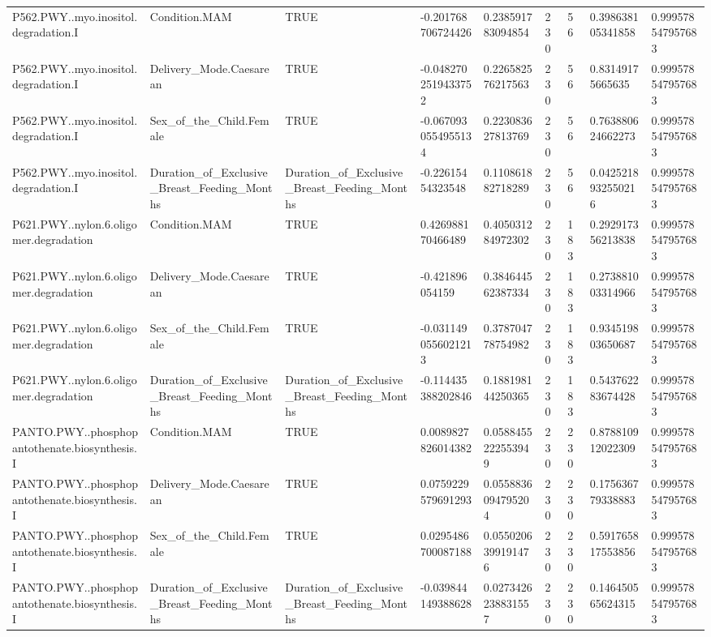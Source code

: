 \begin{longtable}{lllllllll}
P562.PWY..myo.inositol.degradation.I & Condition.MAM & TRUE & -0.201768706724426 & 0.238591783094854 & 230 & 56 & 0.398638105341858 & 0.999578547957683 \\
P562.PWY..myo.inositol.degradation.I & Delivery\_Mode.Caesarean & TRUE & -0.0482702519433752 & 0.226582576217563 & 230 & 56 & 0.83149175665635 & 0.999578547957683 \\
P562.PWY..myo.inositol.degradation.I & Sex\_of\_the\_Child.Female & TRUE & -0.0670930554955134 & 0.223083627813769 & 230 & 56 & 0.763880624662273 & 0.999578547957683 \\
P562.PWY..myo.inositol.degradation.I & Duration\_of\_Exclusive\_Breast\_Feeding\_Months & Duration\_of\_Exclusive\_Breast\_Feeding\_Months & -0.22615454323548 & 0.110861882718289 & 230 & 56 & 0.0425218932550216 & 0.999578547957683 \\
P621.PWY..nylon.6.oligomer.degradation & Condition.MAM & TRUE & 0.426988170466489 & 0.405031284972302 & 230 & 183 & 0.292917356213838 & 0.999578547957683 \\
P621.PWY..nylon.6.oligomer.degradation & Delivery\_Mode.Caesarean & TRUE & -0.421896054159 & 0.384644562387334 & 230 & 183 & 0.273881003314966 & 0.999578547957683 \\
P621.PWY..nylon.6.oligomer.degradation & Sex\_of\_the\_Child.Female & TRUE & -0.0311490556021213 & 0.378704778754982 & 230 & 183 & 0.934519803650687 & 0.999578547957683 \\
P621.PWY..nylon.6.oligomer.degradation & Duration\_of\_Exclusive\_Breast\_Feeding\_Months & Duration\_of\_Exclusive\_Breast\_Feeding\_Months & -0.114435388202846 & 0.188198144250365 & 230 & 183 & 0.543762283674428 & 0.999578547957683 \\
PANTO.PWY..phosphopantothenate.biosynthesis.I & Condition.MAM & TRUE & 0.0089827826014382 & 0.0588455222553949 & 230 & 230 & 0.878810912022309 & 0.999578547957683 \\
PANTO.PWY..phosphopantothenate.biosynthesis.I & Delivery\_Mode.Caesarean & TRUE & 0.0759229579691293 & 0.0558836094795204 & 230 & 230 & 0.175636779338883 & 0.999578547957683 \\
PANTO.PWY..phosphopantothenate.biosynthesis.I & Sex\_of\_the\_Child.Female & TRUE & 0.0295486700087188 & 0.0550206399191476 & 230 & 230 & 0.591765817553856 & 0.999578547957683 \\
PANTO.PWY..phosphopantothenate.biosynthesis.I & Duration\_of\_Exclusive\_Breast\_Feeding\_Months & Duration\_of\_Exclusive\_Breast\_Feeding\_Months & -0.039844149388628 & 0.0273426238831557 & 230 & 230 & 0.146450565624315 & 0.999578547957683 \\

\end{longtable}
